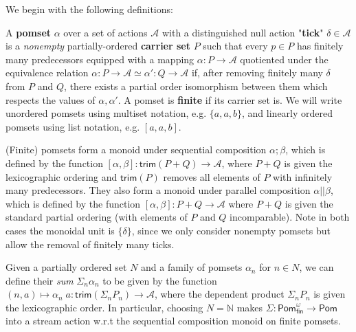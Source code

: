 \documentclass[acmsmall,screen,review]{acmart}
\newcommand{\mc}[1]{\ensuremath{\mathcal{#1}}}
\newcommand{\ms}[1]{\ensuremath{\mathsf{#1}}}
\newcommand{\nats}{\mathbb{N}}
\begin{document}
We begin with the following definitions:
\begin{definition}[Pomset] 
  A \textbf{pomset} \(\alpha\) over a set of actions \(\mc{A}\) with a
  distinguished null action "\textbf{tick}" \(\delta \in \mc{A}\) is a
  \textit{nonempty} partially-ordered \textbf{carrier set} \(P\) such that every
  \(p \in P\) has finitely many predecessors equipped with a mapping \(\alpha: P
  \to \mc{A}\) quotiented under the equivalence relation \(\alpha: P \to \mc{A}
  \simeq \alpha': Q \to \mc{A}\) if, after removing finitely many \(\delta\)
  from \(P\) and \(Q\), there exists a partial order isomorphism between them
  which respects the values of \(\alpha, \alpha'\). A pomset is \textbf{finite}
  if its carrier set is. We will write unordered pomsets using multiset
  notation, e.g. \(\{a, a, b\}\), and linearly ordered pomsets using list
  notation, e.g. \([a, a, b]\).
\end{definition}
(Finite) pomsets form a monoid under sequential composition \(\alpha;\beta\),
which is defined by the function \([\alpha, \beta]: \ms{trim}(P + Q) \to
\mc{A}\), where \(P + Q\) is given the lexicographic ordering and
\(\ms{trim}(P)\) removes all elements of \(P\) with infinitely many
predecessors. They also form a monoid under parallel composition \(\alpha ||
\beta\), which is defined by the function \([\alpha, \beta]: P + Q \to \mc{A}\)
where \(P + Q\) is given the standard partial ordering (with elements of \(P\)
and \(Q\) incomparable). Note in both cases the monoidal unit is \(\{\delta\}\),
since we only consider nonempty pomsets but allow the removal of finitely many
ticks.

Given a partially ordered set \(N\) and a family of pomsets \(\alpha_n\) for \(n \in N\), we can define their \textit{sum} \(\Sigma_n\alpha_n\) to be given by the function \((n, a) \mapsto \alpha_n\;a: \ms{trim}(\Sigma_nP_n) \to \mc{A}\), where the dependent product \(\Sigma_nP_n\) is given the lexicographic order. In particular, choosing \(N = \nats\) makes \(\Sigma: \ms{Pom}_{\ms{fin}}^\omega \to \ms{Pom}\) into a stream action w.r.t the sequential composition monoid on finite pomsets. 
\end{document}
